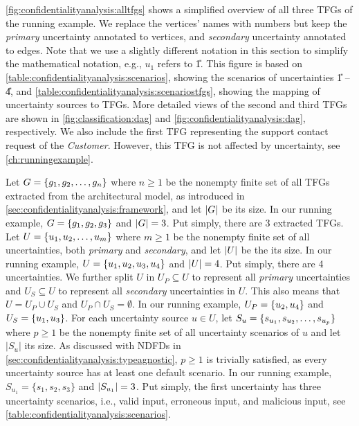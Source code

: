 \autoref{fig:confidentialityanalysis:alltfgs} shows a simplified overview of all three \acp{TFG} of the running example.
We replace the vertices' names with numbers but keep the \emph{primary} uncertainty annotated to vertices, and \emph{secondary} uncertainty annotated to edges.
Note that we use a slightly different notation in this section to simplify the mathematical notation, e.g., $u_{1}$ refers to \U{1}.
This figure is based on \autoref{table:confidentialityanalysis:scenarios}, showing the scenarios of uncertainties \U{1} -- \U{4}, and \autoref{table:confidentialityanalysis:scenariostfgs}, showing the mapping of uncertainty sources to \acp{TFG}.
More detailed views of the second and third \acp{TFG} are shown in \autoref{fig:classification:dag} and \autoref{fig:confidentialityanalysis:dag}, respectively.
We also include the first \ac{TFG} representing the support contact request of the \emph{Customer}.
However, this \ac{TFG} is not affected by uncertainty, see \autoref{ch:runningexample}.

Let $G = \{ g_{1}, g_{2}, \dots, g_{n} \}$ where $n \geq 1$ be the nonempty finite set of all \acp{TFG} extracted from the architectural model, as introduced in \autoref{sec:confidentialityanalysis:framework}, and let $\lvert G\rvert$ be its size.
In our running example, $G = \{ g_{1},g_{2},g_{3} \}$ and $\lvert G\rvert = 3$.
Put simply, there are 3 extracted \acp{TFG}.
Let $U = \{ u_{1}, u_{2}, \dots, u_{m} \}$ where $m \geq 1$ be the nonempty finite set of all uncertainties, both \emph{primary} and \emph{secondary}, and let $ \lvert U\rvert$ be the its size.
In our running example, $U = \{ u_{1}, u_{2}, u_{3},u_{4} \}$ and $\lvert U\rvert = 4$.
Put simply, there are 4 uncertainties. 
We further split $U$ in $U_{P} \subseteq U$ to represent all \emph{primary} uncertainties and $U_{S} \subseteq U$ to represent all \emph{secondary} uncertainties in $U$.
This also means that $U = U_{P} \cup U_{S}$ and $U_{P} \cap U_{S} = \emptyset$.
In our running example, $U_{P} = \{ u_{2}, u_{4} \}$ and $U_{S} = \{ u_{1}, u_{3} \}$.
For each uncertainty source $u \in U $, let $ S_{u} = \{ s_{u_{1}}, s_{u_{2}}, \dots, s_{u_{p}} \}$ where $p \geq 1$ be the nonempty finite set of all uncertainty scenarios of $u$ and let $ \lvert S_{u} \rvert$ its size.
As discussed with \acp{NDFD} in \autoref{sec:confidentialityanalysis:typeagnostic}, $p \geq 1$ is trivially satisfied, as every uncertainty source has at least one default scenario.
In our running example, $ S_{u_{1}} = \{ s_{1}, s_{2}, s_{3} \}$ and $\lvert S_{u_{1}}\rvert = 3$.
Put simply, the first uncertainty has three uncertainty scenarios, i.e., valid input, erroneous input, and malicious input, see \autoref{table:confidentialityanalysis:scenarios}.

